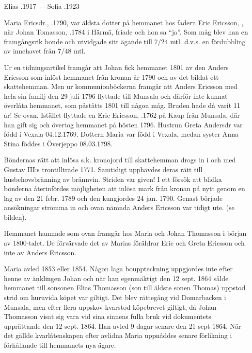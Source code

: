 Elias .1917 --- Sofia .1923


%
Maria Ericsdr., .1790, var äldsta dotter på hemmanet hos fadern Eric Ericsson, , när Johan Tomasson, .1784 i Härmä, friade och hon sa ``ja''. Som måg blev han en framgångsrik bonde och utvidgade sitt ägande till 7/24 mtl. d.v.s. en fördubbling av innehavet från 7/48 mtl.

Ur en tidningsartikel framgår att Johan fick hemmanet 1801 av den Anders Ericsson som inlöst hemmanet från kronan år 1790 och av det bildat ett skattehemman. Men ur kommunionböckerna framgår att Anders Ericsson med hela sin familj den 29 juli 1796 flyttade till Munsala och därför inte kunnat överlåta hemmanet, som påståtts
1801 till någon måg. Bruden hade då varit 11 år! Se ovan. Istället flyttade en Eric Ericsson, .1762 på Kaup från Munsala, där han gift sig och övertog hemmanet på hösten 1796. Hustrun Greta Andersdr var född i Vexala 04.12.1769. Dottern Maria var född i Vexala, medan syster Anna Stina föddes i Överjeppo 08.03.1798.

Böndernas rätt att inlösa s.k. kronojord till skattehemman drogs in i och med Gustav III:s trontillträde 1771. Samtidigt upphävdes deras rätt till husbehovsbränning av brännvin. Striden var given! I ett försök att blidka bönderna återinfördes möjligheten att inlösa mark från kronan på nytt genom en lag av den 21 febr. 1789 och den
kungjordes 24 jan. 1790. Genast började ansökningar strömma in och ovan nämnda Anders Ericsson var tidigt ute. (se bilden).



Hemmanet hamnade som ovan framgår hos Maria och Johan Thomasson i början av 1800-talet. De förvärvade det av Marias föräldrar Eric och Greta Ericsson och inte av Anders Ericsson.
\begin{jhchildren}
  \item {}
  \item {}
  \item {}
  \item {}
\end{jhchildren}
Maria avled 1853 eller 1854. Någon laga bouppteckning uppgjordes inte efter henne av änklingen Johan och när han egenmäktigt den 12 sept. 1864 sålde hemmanet till sonsonen Elias Thomasson (son till äldste sonen Thomas) uppstod strid om huruvida köpet var giltigt. Det blev rättegång vid Domarbacken i Munsala, men efter flera uppskov kvarstod köpebrevet giltigt, då Johan Thomasson visat sig vara vid sina sinnens fulla bruk vid dokumentets upprättande den 12 sept. 1864. Han avled 9 dagar senare den 21 sept 1864. När det gällde kvarlåtenskapen efter avlidna Maria uppnåddes senare förlikning i förhållande till hemmanets nya ägare.



